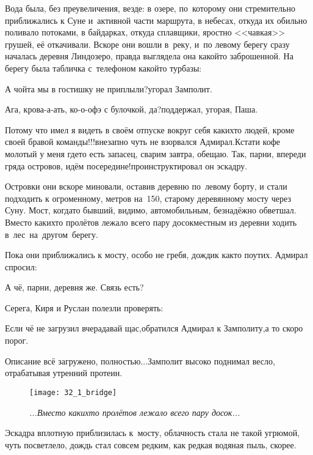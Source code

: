 Вода была, без преувеличения, везде: в озере, по~которому они стремительно приближались к Суне и~активной части маршрута, в небесах, откуда их обильно поливало потоками, в байдарках, откуда сплавщики, яростно <<чавкая>> грушей, её откачивали. Вскоре они вошли в~реку, и~по левому берегу сразу началась деревня Линдозеро, правда выглядела она какой\sdash то заброшенной. На берегу была табличка с~телефоном какой\sdash то турбазы:

\diagdash А чойта мы в гостишку не приплыли?\mdash угорал Замполит.

\diagdash Ага, крова-а-ать, ко-о-офэ с булочкой, да?\mdash поддержал, угорая, Паша.

\diagdash Потому что имел я видеть в своём отпуске вокруг себя каких\sdash то людей, кроме своей бравой команды!!!\mdash внезапно чуть не взорвался Адмирал.\mdash Кстати кофе молотый у меня где\sdash то есть запасец, сварим завтра, обещаю. Так, парни, впереди гряда островов, идём посередине!\mdash проинструктировал он эскадру.

Островки они вскоре миновали, оставив деревню по~левому борту, и стали подходить к огроменному, метров на~150, старому деревянному мосту через Суну. Мост, когда\sdash то бывший, видимо, автомобильным, безнадёжно обветшал. Вместо каких\sdash то пролётов лежало всего пару досок\mdash местным из деревни ходить в~лес~на~другом~берегу.

Пока они приближались к мосту, особо не гребя, дождик как\sdash то поутих. Адмирал спросил:

\diagdash А чё, парни, деревня же. Связь есть?

Серега, Киря и Руслан полезли проверять:

\diagdash Если чё не загрузил вчера\mdash давай щас,\mdash обратился Адмирал к Замполиту,\mdash а то скоро порог.

\diagdash Описание всё загружено, полностью$\ldots$\mdash Замполит высоко поднимал весло, отрабатывая утренний протеин.

{
\setlength{\belowcaptionskip}{0.1mm}
\begin{figure}[h]
	\centering
	\texttt{[image: 32\_1\_bridge]}
	\caption{\small\textit{...Вместо каких\sdash то пролётов лежало всего пару досок...}}
\end{figure}

Эскадра вплотную приблизилась к~мосту, облачность стала не такой угрюмой, чуть посветлело, дождь стал совсем редким, как редкая водяная пыль, скорее. 
}

